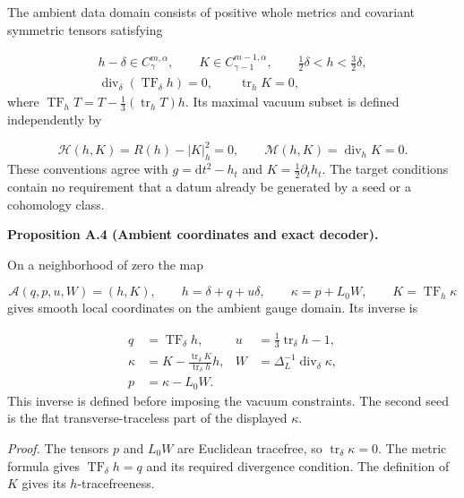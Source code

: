 \documentclass[
  english,
  11pt,
  reqno]{amsart}
\makeatletter
\newcommand{\pandocstatementheading}[1]{%
  \par\addpenalty{\@beginparpenalty}%
  \addvspace{.5\baselineskip plus .2\baselineskip minus .2\baselineskip}%
  {\normalfont\bfseries #1\par}%
  \nobreak\@afterindenttrue\@afterheading
}
\makeatother
\begin{document}
The ambient data domain consists of positive whole metrics and covariant
symmetric tensors satisfying

\label{eq:online-chart-ambient-gauge-domain} \[
\begin{gathered}
h-\delta\in C^{m,\alpha}_\gamma,\qquad
K\in C^{m-1,\alpha}_{\gamma-1},\qquad
\frac12\delta<h<\frac32\delta,\\
\operatorname{div}_\delta(\operatorname{TF}_\delta h)=0,
\qquad \operatorname{tr}_hK=0,
\end{gathered}
\] where \(\operatorname{TF}_h T=T-\frac13(\operatorname{tr}_hT)h\). Its
maximal vacuum subset is defined independently by

\label{eq:online-chart-independent-constraints} \[
\mathcal H(h,K)=R(h)-|K|_h^2=0,\qquad
\mathcal M(h,K)=\operatorname{div}_hK=0.
\] These conventions agree with \(g=\mathrm dt^2-h_t\) and
\(K=\frac12\partial_t h_t\). The target conditions contain no
requirement that a datum already be generated by a seed or a cohomology
class.

\pandocstatementheading{\leavevmode{}\label{prop:online-chart-exact-ambient-decoder}Proposition A.4 (Ambient coordinates and exact decoder).}

On a neighborhood of zero the map

\label{eq:online-chart-ambient-parametrization} \[
\mathcal A(q,p,u,W)=(h,K),\qquad
h=\delta+q+u\delta,\qquad
\kappa=p+L_0W,\qquad
K=\operatorname{TF}_h\kappa
\] gives smooth local coordinates on the ambient gauge domain. Its
inverse is

\label{eq:online-chart-exact-decoder} \[
\begin{aligned}
q&=\operatorname{TF}_\delta h,
&u&=\frac13\operatorname{tr}_\delta h-1,\\
\kappa&=K-\frac{\operatorname{tr}_\delta K}
{\operatorname{tr}_\delta h}h,
&W&=\Delta_L^{-1}\operatorname{div}_\delta\kappa,\\
p&=\kappa-L_0W.
\end{aligned}
\] This inverse is defined before imposing the vacuum constraints. The
second seed is the flat transverse-traceless part of the displayed
\(\kappa\).

\emph{Proof.} The tensors \(p\) and \(L_0W\) are Euclidean tracefree, so
\(\operatorname{tr}_\delta\kappa=0\). The metric formula gives
\(\operatorname{TF}_\delta h=q\) and its required divergence condition.
The definition of \(K\) gives its \(h\)-tracefreeness.
\end{document}
